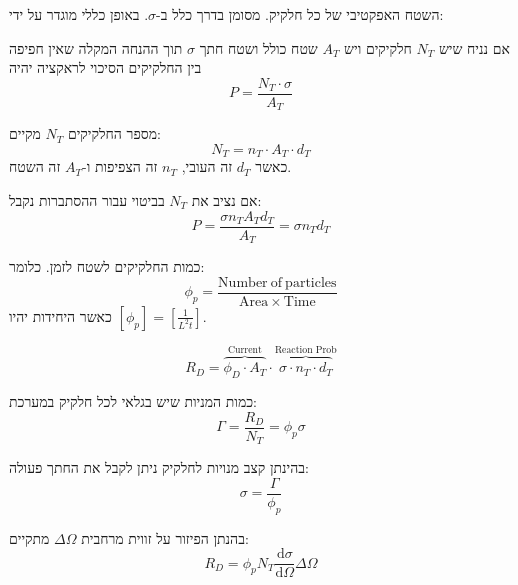 \documentclass{tstextbook}
\begin{document}
\begin{definition}
השטח האפקטיבי של כל חלקיק. מסומן בדרך כלל ב-\(\sigma\). באופן כללי מוגדר על ידי:

\end{definition}
\begin{corollary}
אם נניח שיש \(N_{T}\) חלקיקים ויש \(A_{T}\) שטח כולל ושטח חתך \(\sigma\) תוך ההנחה המקלה שאין חפיפה בין החלקיקים הסיכוי לראקציה יהיה
$$P=\frac{N_{T}\cdot \sigma}{A_{T}}$$

\end{corollary}
\begin{proposition}
מספר החלקיקים \(N_{T}\) מקיים:
$$N_{T}=n_{T}\cdot A_{T} \cdot d_{T}$$
כאשר \(d_{T}\) זה העובי, \(n_{T}\) זה הצפיפות ו-\(A_{T}\) זה השטח.

\end{proposition}
\begin{corollary}
אם נציב את \(N_{T}\) בביטוי עבור ההסתברות נקבל:
$$P=\frac{\sigma n_{T}A_{T}d_{T}}{A_{T}}=\sigma n_{T}d_{T}$$

\end{corollary}
\begin{definition}
כמות החלקיקים לשטח לזמן. כלומר:
$$\phi_{p}=\frac{\mathrm{Number~of~particles}}{\mathrm{Area}\times\mathrm{Time}}$$
כאשר היחידות יהיו \(\left[ \phi_{p} \right]=\left[ \frac{1}{L^{2}t} \right]\).

\end{definition}
\begin{definition}
$$R_{D}=\overbrace{ \phi_{D}\cdot A_{T} }^{ \text{Current} }\cdot \overbrace{ \sigma \cdot n_{T}\cdot d_{T} }^{ \text{Reaction Prob} }$$

\end{definition}
\begin{definition}
כמות המניות שיש בגלאי לכל חלקיק במערכת:
$$\Gamma=\frac{R_{D}}{N_{T}}=\phi_{p}\sigma$$

\end{definition}
\begin{corollary}
בהינתן קצב מנויות לחלקיק ניתן לקבל את החתך פעולה:
$$\sigma=\frac{\Gamma}{\phi_{p}}$$

\end{corollary}
\begin{proposition}
בהנתן הפיזור על זווית מרחבית \(\Delta \Omega\) מתקיים:
$$R_{D}=\phi_{p}N_{T}\frac{\mathrm{d} \sigma}{\mathrm{d} \Omega} \Delta \Omega$$

\end{proposition}
\end{document}
